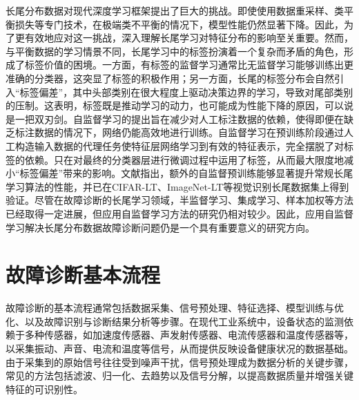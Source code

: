 \documentclass[master]{thesis-uestc}
\begin{document}
长尾分布数据对现代深度学习框架提出了巨大的挑战。即使使用数据重采样、类平衡损失等专门技术，在极端类不平衡的情况下，模型性能仍然显著下降。因此，为了更有效地应对这一挑战，深入理解长尾学习对特征分布的影响至关重要。然而，与平衡数据的学习情景不同，长尾学习中的标签扮演着一个复杂而矛盾的角色，形成了标签价值的困境。一方面，有标签的监督学习通常比无监督学习能够训练出更准确的分类器，这突显了标签的积极作用；另一方面，长尾的标签分布会自然引入“标签偏差”，其中头部类别在很大程度上驱动决策边界的学习，导致对尾部类别的压制。这表明，标签既是推动学习的动力，也可能成为性能下降的原因，可以说是一把双刃剑。自监督学习的提出旨在减少对人工标注数据的依赖，使得即便在缺乏标注数据的情况下，网络仍能高效地进行训练。自监督学习在预训练阶段通过人工构造输入数据的代理任务使特征层网络学习到有效的特征表示，完全摆脱了对标签的依赖。只在对最终的分类器层进行微调过程中运用了标签，从而最大限度地减小“标签偏差”带来的影响。文献\cite{zhang2021federated}指出，额外的自监督预训练能够显著提升常规长尾学习算法的性能，并已在CIFAR-LT、ImageNet-LT等视觉识别长尾数据集上得到验证。尽管在故障诊断的长尾学习领域，半监督学习、集成学习、样本加权等方法已经取得一定进展，但应用自监督学习方法的研究仍相对较少。因此，应用自监督学习解决长尾分布数据故障诊断问题仍是一个具有重要意义的研究方向。

\FloatBarrier  %

\section{故障诊断基本流程}
故障诊断的基本流程通常包括数据采集、信号预处理、特征选择、模型训练与优化、以及故障识别与诊断结果分析等步骤。在现代工业系统中，设备状态的监测依赖于多种传感器，如加速度传感器、声发射传感器、电流传感器和温度传感器等，以采集振动、声音、电流和温度等信号，从而提供反映设备健康状况的数据基础。由于采集到的原始信号往往受到噪声干扰，信号预处理成为数据分析的关键步骤，常见的方法包括滤波、归一化、去趋势以及信号分解，以提高数据质量并增强关键特征的可识别性。
\end{document}
